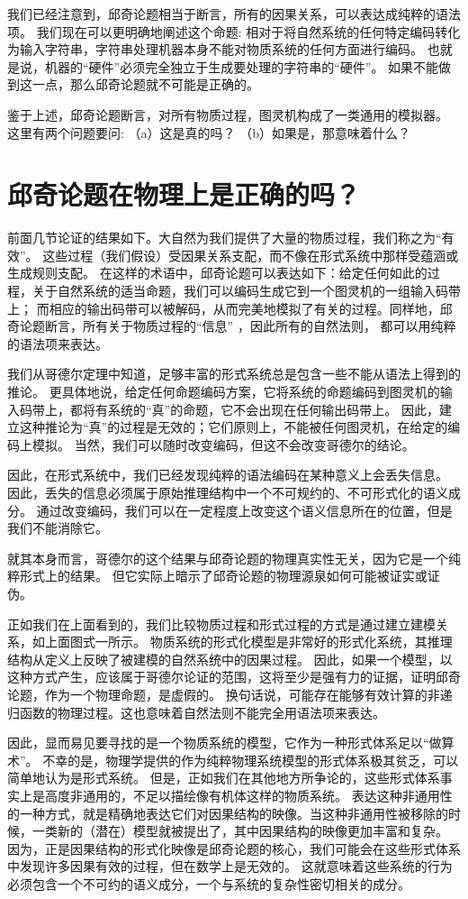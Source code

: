 \documentclass[a4paper,12pt]{article}
\begin{document}
我们已经注意到，邱奇论题相当于断言，所有的因果关系，可以表达成纯粹的语法项。
我们现在可以更明确地阐述这个命题: 相对于将自然系统的任何特定编码转化为输入字符串，字符串处理机器本身不能对物质系统的任何方面进行编码。
也就是说，机器的“硬件”必须完全独立于生成要处理的字符串的“硬件”。 如果不能做到这一点，那么邱奇论题就不可能是正确的。

鉴于上述，邱奇论题断言，对所有物质过程，图灵机构成了一类通用的模拟器。 这里有两个问题要问: （a）这是真的吗？ （b）如果是，那意味着什么？

\section{邱奇论题在物理上是正确的吗？}

前面几节论证的结果如下。大自然为我们提供了大量的物质过程，我们称之为“有效”。
这些过程（我们假设）受因果关系支配，而不像在形式系统中那样受蕴涵或生成规则支配。
在这样的术语中，邱奇论题可以表达如下：给定任何如此的过程，关于自然系统的适当命题，我们可以编码生成它到一个图灵机的一组输入码带上；
而相应的输出码带可以被解码，从而完美地模拟了有关的过程。同样地，邱奇论题断言，所有关于物质过程的“信息” ，因此所有的自然法则，
都可以用纯粹的语法项来表达。

我们从哥德尔定理中知道，足够丰富的形式系统总是包含一些不能从语法上得到的推论。
更具体地说，给定任何命题编码方案，它将系统的命题编码到图灵机的输入码带上，都将有系统的“真”的命题，它不会出现在任何输出码带上。
因此，建立这种推论为“真”的过程是无效的；它们原则上，不能被任何图灵机，在给定的编码上模拟。
当然，我们可以随时改变编码，但这不会改变哥德尔的结论。

因此，在形式系统中，我们已经发现纯粹的语法编码在某种意义上会丢失信息。
因此，丢失的信息必须属于原始推理结构中一个不可规约的、不可形式化的语义成分。
通过改变编码，我们可以在一定程度上改变这个语义信息所在的位置，但是我们不能消除它。

就其本身而言，哥德尔的这个结果与邱奇论题的物理真实性无关，因为它是一个纯粹形式上的结果。
但它实际上暗示了邱奇论题的物理源泉如何可能被证实或证伪。

正如我们在上面看到的，我们比较物质过程和形式过程的方式是通过建立建模关系，如上面图式一所示。
物质系统的形式化模型是非常好的形式化系统，其推理结构从定义上反映了被建模的自然系统中的因果过程。
因此，如果一个模型，以这种方式产生，应该属于哥德尔论证的范围，这将至少是强有力的证据，证明邱奇论题，作为一个物理命题，是虚假的。
换句话说，可能存在能够有效计算的非递归函数的物理过程。这也意味着自然法则不能完全用语法项来表达。

因此，显而易见要寻找的是一个物质系统的模型，它作为一种形式体系足以“做算术”。
不幸的是，物理学提供的作为纯粹物理系统模型的形式体系极其贫乏，可以简单地认为是形式系统。
但是，正如我们在其他地方所争论的，这些形式体系事实上是高度非通用的，不足以描绘像有机体这样的物质系统\cite{RosenRinpress}。
表达这种非通用性的一种方式，就是精确地表达它们对因果结构的映像。当这种非通用性被移除的时候，一类新的（潜在）模型就被提出了，其中因果结构的映像更加丰富和复杂。
因为，正是因果结构的形式化映像是邱奇论题的核心，我们可能会在这些形式体系中发现许多因果有效的过程，但在数学上是无效的。
这就意味着这些系统的行为必须包含一个不可约的语义成分，一个与系统的复杂性密切相关的成分。
\end{document}
